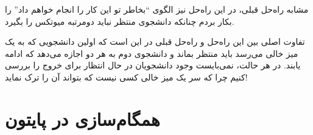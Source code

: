 \documentclass{book}
\newcommand{\clearemptydoublepage}{\newpage\cleardoublepage}
\begin{document}
    مشابه راه‌حل قبلی، در این راه‌حل نیز الگوی ``بخاطر تو این کار را انجام خواهم داد'' را بکار بردم چنانکه دانشجوی منتظر نباید دومرتبه میوتکس را بگیرد. 

    تفاوت اصلی بین این راه‌حل و راه‌حل قبلی در این است که اولین دانشجویی که به یک میز خالی می‌رسد باید منتظر بماند و دانشجوی دوم به هر دو اجازه 
    می‌دهد که ادامه یابند. در هر حالت، نمی‌بایست وجود دانشجویان در حال انتظار برای خروج را بررسی کنیم چرا که سر یک میز خالی کسی نیست که بتواند
    آن را ترک نماید!
    










\chapter{همگام‌سازی در پایتون}
\label{pysync}
\end{document}
